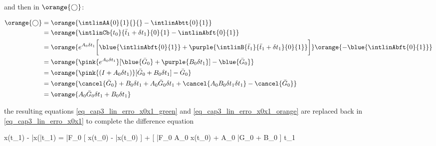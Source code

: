 \noindent
and then in $\orange{\bigcirc}$:

\noindent
\begin{align}
	\label{eq_cap3_lin_erro_x0x1_orange}
	\orange{\bigcirc} 	&= \orange{ \intlinAA{0}{1}{}{} - \intlinAbtt{0}{1} } \nonumber \\ 
				   	&= \orange{ \intlinCb{t_0}{\bar{t}_1+\delta t_1}{0}{1} - \intlinAbft{0}{1} } \nonumber \\
				   	&= \orange{ e^{A_0 \delta t_1} \bigg[ \blue{\intlinAbft{0}{1}} + \purple{\intlinB{\bar{t}_1}{\bar{t}_1 + \delta t_1}{0}{1}} \bigg] }
				   	   \orange{ -\blue{\intlinAbft{0}{1}} } \nonumber \\
				   	&= \orange{ \pink{e^{A_0 \delta t_1}} [ \blue{\bar{G}_0} + \purple{B_0 \delta t_1} ] - \blue{\bar{G}_0} } \nonumber \\
				   	&= \orange{ \pink{(I + A_0 \delta t_1)}[ \bar{G}_0 + B_0 \delta t_1 ] - \bar{G}_0 } \nonumber \\
				   	&= \orange{ \cancel{\bar{G}_0} + B_0 \delta t_1 + A_0 \bar{G}_0 \delta t_1 + \cancel{A_0 B_0 \delta t_1 \delta t_1} - \cancel{\bar{G}_0} } \nonumber \\
				   	&= \orange{ A_0 \bar{G}_0 \delta t_1 + B_0 \delta t_1 }
\end{align}

\noindent
the resulting equations \eqref{eq_cap3_lin_erro_x0x1_green} and \eqref{eq_cap3_lin_erro_x0x1_orange} are replaced back in \eqref{eq_cap3_lin_erro_x0x1} to complete the difference equation

\noindent
{}
{
	x(t_1) - \bar{x}(\bar{t}_1) = \bar{F}_0 [ x(t_0) - \bar{x}(t_0) ] + [ \bar{F}_0 A_0 x(t_0) + A_0 \bar{G}_0 + B_0 ] \delta t_1
}